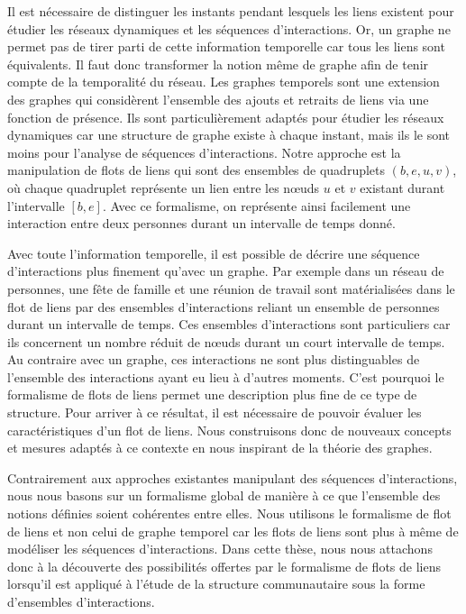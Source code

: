 Il est nécessaire de distinguer les instants pendant lesquels les liens existent pour étudier les réseaux dynamiques et les séquences d'interactions.
Or, un graphe ne permet pas de tirer parti de cette information temporelle car tous les liens sont équivalents. 
Il faut donc transformer la notion même de graphe afin de tenir compte de la temporalité du réseau.
Les graphes temporels sont une extension des graphes qui considèrent l'ensemble des ajouts et retraits de liens via une fonction de présence.
Ils sont particulièrement adaptés pour étudier les réseaux dynamiques car une structure de graphe existe à chaque instant, mais ils le sont moins pour l'analyse de séquences d'interactions.
Notre approche est la manipulation de flots de liens qui sont des ensembles de quadruplets $(b, e, u, v)$, où chaque quadruplet représente un lien entre les n\oe{}uds $u$ et $v$ existant durant l'intervalle $[b,e]$.
Avec ce formalisme, on représente ainsi facilement une interaction entre deux personnes durant un intervalle de temps donné.


Avec toute l'information temporelle, il est possible de décrire une séquence d'interactions plus finement qu'avec un graphe.
Par exemple dans un réseau de personnes, une fête de famille et une réunion de travail sont matérialisées dans le flot de liens par des ensembles d'interactions reliant un ensemble de personnes durant un intervalle de temps.
Ces ensembles d'interactions sont particuliers car ils concernent un nombre réduit de n\oe{}uds durant un court intervalle de temps.
Au contraire avec un graphe, ces interactions ne sont plus distinguables de l'ensemble des interactions ayant eu lieu à d'autres moments.
C'est pourquoi le formalisme de flots de liens permet une description plus fine de ce type de structure.
Pour arriver à ce résultat, il est nécessaire de pouvoir évaluer les caractéristiques d'un flot de liens.
Nous construisons donc de nouveaux concepts et mesures adaptés à ce contexte en nous inspirant de la théorie des graphes.


\bigskip


Contrairement aux approches existantes manipulant des séquences d'interactions, nous nous basons sur un formalisme global de manière à ce que l'ensemble des notions définies soient cohérentes entre elles.
Nous utilisons le formalisme de flot de liens et non celui de graphe temporel car les flots de liens sont plus à même de modéliser les séquences d'interactions.
Dans cette thèse, nous nous attachons donc à la découverte des possibilités offertes par le formalisme de flots de liens lorsqu'il est appliqué à l'étude de la structure communautaire sous la forme d'ensembles d'interactions.

